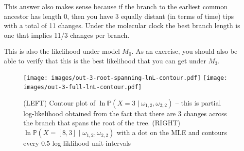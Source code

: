 \documentclass[11pt]{article}
\renewcommand{\Pr}{\mathbb{P}}
\begin{document}
This answer also makes sense because if the branch to the earliest common ancestor has length 0, then
 you have 3 equally distant (in terms of time) tips with 
 a total of 11 changes.
Under the molecular clock the best branch length is one that
    implies 11/3 changes per branch.

This is also the likelihood under model $M_0$. 
As an exercise, you should also be able to verify that this
is the best likelihood that you can get under $M_3$.

\begin{figure}[h]
\hskip-1cm \texttt{[image: images/out-3-root-spanning-lnL-contour.pdf]}
\hskip-1cm \texttt{[image: images/out-3-full-lnL-contour.pdf]}
\caption{(LEFT) Contour plot of $\ln\Pr(X=3\mid\omega_{1,2}, 
\omega_{2,2})$ -- this is partial log-likelihood obtained from the fact that there are 3 changes across the branch that spans the root of the tree.
(RIGHT) $\ln\Pr(X=[8,3]\mid\omega_{1,2}, \omega_{2,2})$ with a dot on the MLE and contours every 0.5 log-liklihood unit intervals}\label{fullLnLOut3}
\end{figure}
\end{document}
